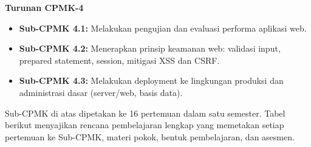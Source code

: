 \textbf{Turunan CPMK-4}
\begin{itemize}[leftmargin=*]
  \item \textbf{Sub-CPMK 4.1:} Melakukan pengujian dan evaluasi performa aplikasi web.
  \item \textbf{Sub-CPMK 4.2:} Menerapkan prinsip keamanan web: validasi input, prepared statement, session, mitigasi XSS dan CSRF.
  \item \textbf{Sub-CPMK 4.3:} Melakukan deployment ke lingkungan produksi dan administrasi dasar (server/web, basis data).
\end{itemize}

Sub-CPMK di atas dipetakan ke 16 pertemuan dalam satu semester. Tabel berikut menyajikan rencana pembelajaran lengkap yang memetakan setiap pertemuan ke Sub-CPMK, materi pokok, bentuk pembelajaran, dan asesmen.
